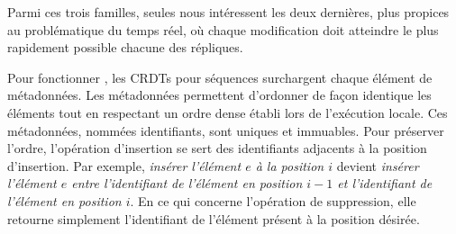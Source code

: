 




\noindent Parmi ces trois familles, seules nous intéressent les deux dernières,
plus propices au problématique du temps réel, où chaque modification doit
atteindre le plus rapidement possible chacune des répliques.

Pour fonctionner , les CRDTs pour séquences surchargent chaque élément de
métadonnées. Les métadonnées permettent d'ordonner de façon identique les
éléments tout en respectant un ordre dense établi lors de l'exécution
locale. Ces métadonnées, nommées identifiants, sont uniques et immuables. Pour
préserver l'ordre, l'opération d'insertion se sert des identifiants adjacents à
la position d'insertion. Par exemple, \emph{insérer l'élément $e$ à la position
  $i$} devient \emph{insérer l'élément $e$ entre l'identifiant de l'élément en
  position $i-1$ et l'identifiant de l'élément en position $i$}. En ce qui
concerne l'opération de suppression, elle retourne simplement l'identifiant de
l'élément présent à la position désirée.


